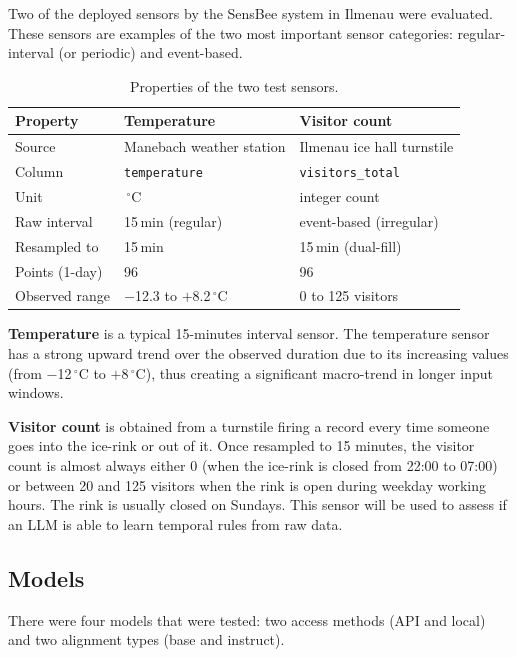 \documentclass[11pt,a4paper]{article}
\begin{document}
Two of the deployed sensors by the SensBee system in Ilmenau were evaluated. These sensors are examples of the two most important sensor categories: regular-interval (or periodic) and event-based.

\begin{table}[H]
\centering
\caption{Properties of the two test sensors.}
\label{tab:datasets}
\small
\begin{tabular}{lll}
\toprule
Property         & Temperature              & Visitor count \\
\midrule
Source           & Manebach weather station & Ilmenau ice hall turnstile \\
Column           & \texttt{temperature}     & \texttt{visitors\_total} \\
Unit             & \,$^{\circ}$C            & integer count \\
Raw interval     & 15\,min (regular)        & event-based (irregular) \\
Resampled to     & 15\,min                  & 15\,min (dual-fill) \\
Points (1-day)   & 96                       & 96 \\
Observed range   & $-$12.3 to $+$8.2\,$^{\circ}$C & 0 to 125 visitors \\
\bottomrule
\end{tabular}
\end{table}

\textbf{Temperature} is a typical 15-minutes interval sensor. The temperature sensor has a strong upward trend over the observed duration due to its increasing values (from $-$12\,$^{\circ}$C to $+$8\,$^{\circ}$C), thus creating a significant macro-trend in longer input windows.

\textbf{Visitor count} is obtained from a turnstile firing a record every time someone goes into the ice-rink or out of it. Once resampled to 15 minutes, the visitor count is almost always either 0 (when the ice-rink is closed from 22:00 to 07:00) or between 20 and 125 visitors when the rink is open during weekday working hours. The rink is usually closed on Sundays. This sensor will be used to assess if an LLM is able to learn temporal rules from raw data.

\subsection{Models}

There were four models that were tested: two access methods (API and local) and two alignment types (base and instruct).
\end{document}
